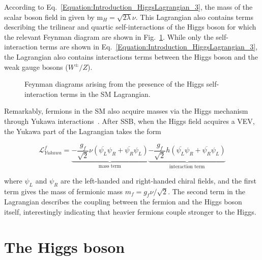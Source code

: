 According to Eq.~\ref{Equation:Introduction_HiggsLagrangian_3}, the mass of the scalar boson field in given by $\text{m}_H = \sqrt{2\lambda}\nu$. This Lagrangian also contains terms describing the trilinear and quartic self-interactions of the Higgs boson for which the relevant Feynman diagram are shown in Fig.~\ref{Figure:Introduction_HiggsSelf}. While only the self-interaction terms are shown in Eq.~\ref{Equation:Introduction_HiggsLagrangian_3}, the Lagrangian also contains interactions terms between the Higgs boson and the weak gauge bosons ($W^\pm/Z$). 

\begin{figure}[h]
    \centering
    \begin{subfigure}{0.45\textwidth}
        \centering
        
    \end{subfigure}
    \hfill
    \begin{subfigure}{0.45\textwidth}
        \centering
        
    \end{subfigure}
    \caption{Feynman diagrams arising from the presence of the Higgs self-interaction terms in the SM Lagrangian.}
    \label{Figure:Introduction_HiggsSelf}
\end{figure}

Remarkably, fermions in the SM also acquire masses via the Higgs mechanism through Yukawa interactions~\cite{YukawaInteractions}. After SSB, when the Higgs field acquires a VEV, the Yukawa part of the Lagrangian takes the form

\begin{equation}
    \mathcal{L}_{Yukawa}^f = \underbrace{-\frac{g_f}{\sqrt{2}}\nu(\overline{\psi_L}\psi_R + \overline{\psi_R} \psi_L)}_{\text{mass term}} \underbrace{- \frac{g_f}{\sqrt{2}}h(\overline{\psi_L}\psi_R + \overline{\psi_R} \psi_L)}_{\text{interaction term}}
\end{equation}

where $\psi_L$ and $\psi_R$ are the left-handed and right-handed chiral fields, and the first term gives the mass of fermionic mass $m_f = g_f\nu / \sqrt{2}$. The second term in the Lagrangian describes the coupling between the fermion and the Higgs boson itself, interestingly indicating that heavier fermions couple stronger to the Higgs.

\section{The Higgs boson}

